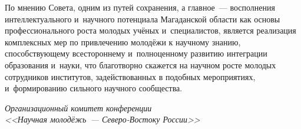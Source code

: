 По мнению Совета, одним из путей сохранения, а главное~--- восполнения интеллектуального и~научного потенциала Магаданской области как основы профессионального роста молодых учёных и~специалистов, является реализация комплексных мер по привлечению молодёжи к научному знанию, способствующему всестороннему и~полноценному развитию интеграции образования и~науки, что благотворно скажется на научном росте молодых сотрудников институтов, задействованных в подобных мероприятиях, и~формированию сильного научного сообщества.


\begin{flushright}
\textit{Организационный комитет конференции\\
<<Научная молодёжь~--- Северо-Востоку России>>}
\end{flushright}
